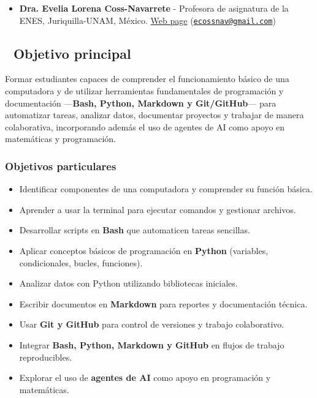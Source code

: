 \documentclass[
  spanish,
  12pt,
  letterpaper,
  DIV=11,
  numbers=noendperiod]{scrreprt}
\providecommand{\tightlist}{%
  \setlength{\itemsep}{0pt}\setlength{\parskip}{0pt}}
\begin{document}
\begin{itemize}
\tightlist
\item
  \textbf{Dra. Evelia Lorena Coss-Navarrete} - Profesora de asignatura
  de la ENES, Juriquilla-UNAM, México.
  \href{https://eveliacoss.github.io/}{Web page}
  (\href{mailto:ecossnav@gmail.com}{\nolinkurl{ecossnav@gmail.com}})
\end{itemize}

\subsection*{🎯 Objetivo principal}\label{objetivo-principal}

Formar estudiantes capaces de comprender el funcionamiento básico de una
computadora y de utilizar herramientas fundamentales de programación y
documentación ---\textbf{Bash, Python, Markdown y Git/GitHub}--- para
automatizar tareas, analizar datos, documentar proyectos y trabajar de
manera colaborativa, incorporando además el uso de agentes de AI como
apoyo en matemáticas y programación.

\subsubsection*{Objetivos particulares}\label{objetivos-particulares}

\begin{itemize}
\tightlist
\item
  Identificar componentes de una computadora y comprender su función
  básica.
\item
  Aprender a usar la terminal para ejecutar comandos y gestionar
  archivos.
\item
  Desarrollar scripts en \textbf{Bash} que automaticen tareas sencillas.
\item
  Aplicar conceptos básicos de programación en \textbf{Python}
  (variables, condicionales, bucles, funciones).
\item
  Analizar datos con Python utilizando bibliotecas iniciales.
\item
  Escribir documentos en \textbf{Markdown} para reportes y documentación
  técnica.
\item
  Usar \textbf{Git y GitHub} para control de versiones y trabajo
  colaborativo.
\item
  Integrar \textbf{Bash, Python, Markdown y GitHub} en flujos de trabajo
  reproducibles.
\item
  Explorar el uso de \textbf{agentes de AI} como apoyo en programación y
  matemáticas.
\end{itemize}
\end{document}
